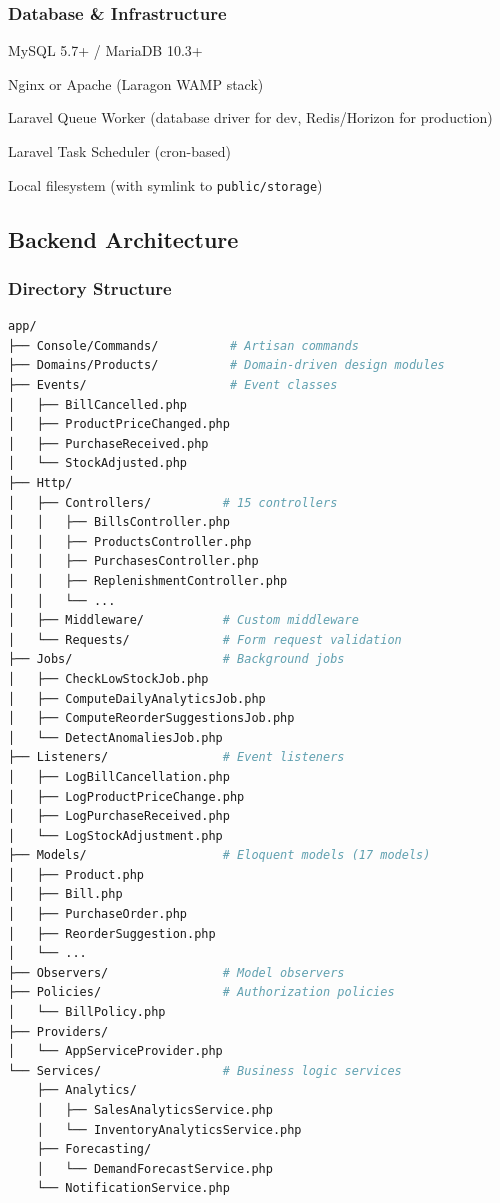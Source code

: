 \subsubsection{Database \& Infrastructure}

\begin{description}[leftmargin=3cm,style=nextline]
    \item[Database] MySQL 5.7+ / MariaDB 10.3+
    \item[Web Server] Nginx or Apache (Laragon WAMP stack)
    \item[Process Manager] Laravel Queue Worker (database driver for dev, Redis/Horizon for production)
    \item[Scheduler] Laravel Task Scheduler (cron-based)
    \item[Storage] Local filesystem (with symlink to \texttt{public/storage})
\end{description}

\subsection{Backend Architecture}

\subsubsection{Directory Structure}

\begin{lstlisting}[language=bash,label=lst:backend-structure,caption={Laravel Backend Structure}]
app/
├── Console/Commands/          # Artisan commands
├── Domains/Products/          # Domain-driven design modules
├── Events/                    # Event classes
│   ├── BillCancelled.php
│   ├── ProductPriceChanged.php
│   ├── PurchaseReceived.php
│   └── StockAdjusted.php
├── Http/
│   ├── Controllers/          # 15 controllers
│   │   ├── BillsController.php
│   │   ├── ProductsController.php
│   │   ├── PurchasesController.php
│   │   ├── ReplenishmentController.php
│   │   └── ...
│   ├── Middleware/           # Custom middleware
│   └── Requests/             # Form request validation
├── Jobs/                     # Background jobs
│   ├── CheckLowStockJob.php
│   ├── ComputeDailyAnalyticsJob.php
│   ├── ComputeReorderSuggestionsJob.php
│   └── DetectAnomaliesJob.php
├── Listeners/                # Event listeners
│   ├── LogBillCancellation.php
│   ├── LogProductPriceChange.php
│   ├── LogPurchaseReceived.php
│   └── LogStockAdjustment.php
├── Models/                   # Eloquent models (17 models)
│   ├── Product.php
│   ├── Bill.php
│   ├── PurchaseOrder.php
│   ├── ReorderSuggestion.php
│   └── ...
├── Observers/                # Model observers
├── Policies/                 # Authorization policies
│   └── BillPolicy.php
├── Providers/
│   └── AppServiceProvider.php
└── Services/                 # Business logic services
    ├── Analytics/
    │   ├── SalesAnalyticsService.php
    │   └── InventoryAnalyticsService.php
    ├── Forecasting/
    │   └── DemandForecastService.php
    └── NotificationService.php
\end{lstlisting}

